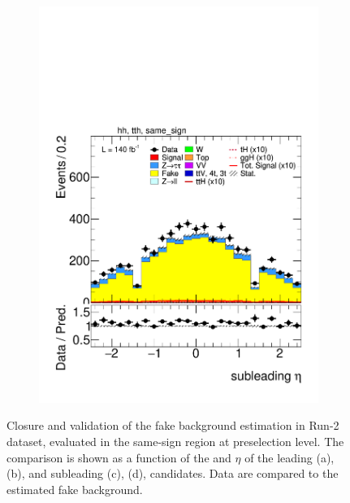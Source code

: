 \begin{figure}[htbp]
\begin{subfigure}[b]{0.45\textwidth}
      \includegraphics[width=\textwidth]{images/fakes_run2/plot_tau_1_eta_hh_tth_15_16_17_18_same_sign.pdf}
      \caption{}
    \end{subfigure}
  
    \caption{
      Closure and validation of the fake background estimation in Run-2 dataset, evaluated in the same-sign region at preselection level.
      The comparison is shown as a function of the \pt and $\eta$ of the leading (a), (b), and subleading (c), (d), \tauhad candidates. 
      Data are compared to the estimated fake background.
    }
    \label{fig:closure_validation_run2}
  \end{figure}

